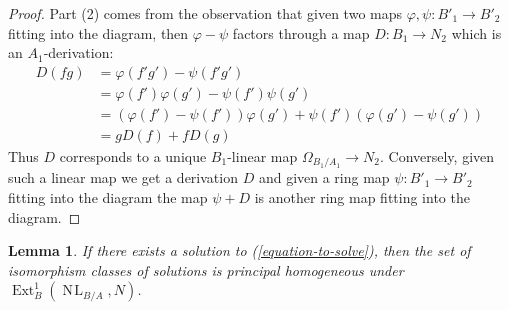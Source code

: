 \documentclass{stacks-project}
\theoremstyle{plain}
\newtheorem{lemma}[subsection]{Lemma}
\theoremstyle{definition}
\theoremstyle{remark}
\numberwithin{equation}{subsection}
\def\Ext{\mathop{\mathrm{Ext}}\nolimits}
\def\NL{\mathop{N\!L}\nolimits}
\begin{document}
\begin{proof}
\medskip\noindent
Part (2) comes from the observation that given two maps
$\varphi, \psi : B'_1 \to B'_2$ fitting into the diagram, then
$\varphi - \psi$ factors through a map $D : B_1 \to N_2$ which
is an $A_1$-derivation:
\begin{align*}
D(fg) & = \varphi(f'g') - \psi(f'g') \\
& =
\varphi(f')\varphi(g') - \psi(f')\psi(g') \\
& =
(\varphi(f') - \psi(f'))\varphi(g') + \psi(f')(\varphi(g') - \psi(g')) \\
& =
gD(f) + fD(g)
\end{align*}
Thus $D$ corresponds to a unique $B_1$-linear map
$\Omega_{B_1/A_1} \to N_2$. Conversely, given such a linear map
we get a derivation $D$ and given a ring map $\psi : B'_1 \to B'_2$
fitting into the diagram
the map $\psi + D$ is another ring map fitting into the diagram.
\end{proof}

\begin{lemma}
\label{lemma-choices}
If there exists a solution to (\ref{equation-to-solve}), then the set of
isomorphism classes of solutions is principal homogeneous under
$\Ext^1_B(\NL_{B/A}, N)$.
\end{lemma}
\end{document}
